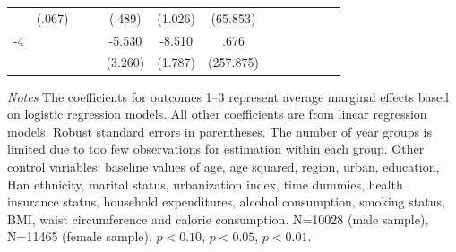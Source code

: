 \begin{table}[p]
\begin{adjustbox}{max width=\linewidth}
\begin{threeparttable}
{\begin{tabular}{l*{6}{SS}}
                &   (.067)         &           &          &   (.489)         &  (1.026)         & (65.853)         \\
-4             &              &              &              &   -5.530\sym{*}  &   -8.510\sym{***}&     .676         \\
                &             &               &              &  (3.260)         &  (1.787)         &(257.875)         \\    
\bottomrule
\end{tabular}
\begin{tablenotes}
\item \footnotesize \textit{Notes} The coefficients for outcomes 1--3 represent average marginal effects based on logistic regression models. All other coefficients are from linear regression models. Robust standard errors in parentheses.  The number of year groups is limited due to too few observations for estimation within each group. Other control variables: baseline values of age, age squared, region, urban, education, Han ethnicity, marital status, urbanization index, time dummies, health insurance status, household expenditures, alcohol consumption, smoking status, BMI, waist circumference and calorie consumption. N=10028 (male sample), N=11465 (female sample). \sym{*} \(p<0.10\), \sym{**} \(p<0.05\), \sym{***} \(p<0.01\).
\end{tablenotes}
}
\end{threeparttable}
\end{adjustbox}
\end{table}

\clearpage

